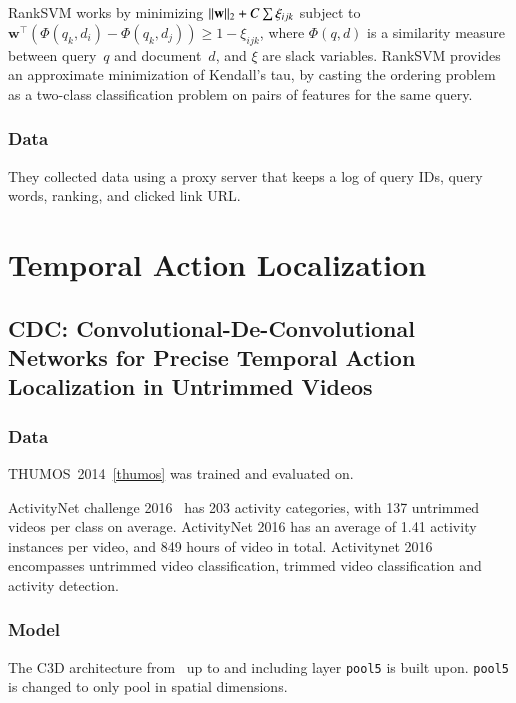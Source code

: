 \documentclass[a4paper, 12pt]{article}
\DeclarePairedDelimiter\norm{\lVert}{\rVert}%
\begin{document}
RankSVM works by minimizing $\norm{\mathbf{w}}_2 + C\sum \xi_{ijk}$ subject to
$\mathbf{w}^\intercal (\Phi(q_k, d_i) - \Phi(q_k, d_j)) \geq 1 - \xi_{ijk}$,
where $\Phi(q, d)$ is a similarity measure between query~$q$ and document~$d$,
and $\xi$ are slack variables. RankSVM provides an approximate minimization of
Kendall's tau, by casting the ordering problem as a two-class classification
problem on pairs of features for the same query.


\subsubsection{Data}

They collected data using a proxy server that keeps a log of query IDs, query
words, ranking, and clicked link URL.


\section{Temporal Action Localization}


\subsection{CDC\@: Convolutional-De-Convolutional Networks for Precise Temporal
            Action Localization in Untrimmed
            Videos~\citet{DBLP:journals/corr/ShouCZMC17}}

\subsubsection{Data}

THUMOS~2014~\ref{thumos} was trained and evaluated on.

ActivityNet challenge 2016~\citet{Heilbron_2015_CVPR} has 203 activity
categories, with 137 untrimmed videos per class on average. ActivityNet 2016
has an average of 1.41 activity instances per video, and 849 hours of video in
total. Activitynet 2016 encompasses untrimmed video classification, trimmed
video classification and activity detection.

\subsubsection{Model}

The C3D architecture
from~\citet{DBLP:journals/corr/TranBFTP15, DBLP:journals/corr/TranBFTP14} up to
and including layer \verb|pool5| is built upon. \verb|pool5| is changed to only
pool in spatial dimensions.
\end{document}

